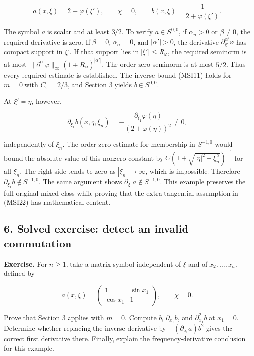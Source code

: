 \documentclass[
  11pt,
]{article}
\begin{document}
\[
a(x,\xi)=2+\varphi(\xi'),\qquad \chi=0,
\qquad b(x,\xi)=\frac1{2+\varphi(\xi')}.
\tag{MSI36}
\]

The symbol \(a\) is scalar and at least \(3/2\). To verify
\(a\in S^{0,0}\), if \(\alpha_n>0\) or \(\beta\ne0\), the required
derivative is zero. If \(\beta=0\), \(\alpha_n=0\), and \(|\alpha'|>0\),
the derivative \(\partial_{\xi'}^{\alpha'}\varphi\) has compact support
in \(\xi'\). If that support lies in \(|\xi'|\leq R_\varphi\), the
required seminorm is at most
\(\|\partial^{\alpha'}\varphi\|_\infty(1+R_\varphi)^{|\alpha'|}\). The
order-zero seminorm is at most \(5/2\). Thus every required estimate is
established. The inverse bound (MSI11) holds for \(m=0\) with
\(C_0=2/3\), and Section 3 yields \(b\in S^{0,0}\).

At \(\xi'=\eta\), however,

\[
\partial_{\xi_1}b(x,\eta,\xi_n)
=-\frac{\partial_{\xi_1}\varphi(\eta)}
        {(2+\varphi(\eta))^2}\ne0,
\tag{MSI37}
\]

independently of \(\xi_n\). The order-zero estimate for membership in
\(S^{-1,0}\) would bound the absolute value of this nonzero constant by
\(C(1+\sqrt{|\eta|^2+\xi_n^2})^{-1}\) for all \(\xi_n\). The right side
tends to zero as \(|\xi_n|\to\infty\), which is impossible. Therefore
\(\partial_{\xi_1}b\notin S^{-1,0}\). The same argument shows
\(\partial_{\xi_1}a\notin S^{-1,0}\). This example preserves the full
original mixed class while proving that the extra tangential assumption
in (MSI22) has mathematical content.

\subsection{6. Solved exercise: detect an invalid
commutation}\label{solved-exercise-detect-an-invalid-commutation}

\textbf{Exercise.} For \(n\geq1\), take a matrix symbol independent of
\(\xi\) and of \(x_2,\ldots,x_n\), defined by

\[
a(x,\xi)=
\begin{pmatrix}1&\sin x_1\\\cos x_1&1\end{pmatrix},
\qquad \chi=0.
\tag{MSI38}
\]

Prove that Section 3 applies with \(m=0\). Compute \(b\),
\(\partial_{x_1}b\), and \(\partial_{x_1}^2b\) at \(x_1=0\). Determine
whether replacing the inverse derivative by \(- (\partial_{x_1}a)b^2\)
gives the correct first derivative there. Finally, explain the
frequency-derivative conclusion for this example.
\end{document}

